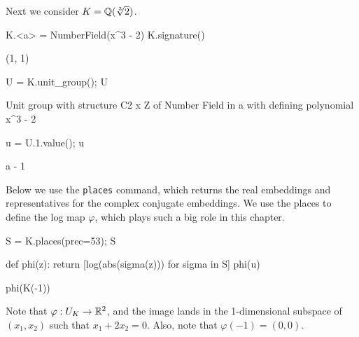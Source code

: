 Next we consider $K=\mathbb{Q}(\sqrt[3]{2})$.
\begin{sagecode}
\begin{sagecell}
K.<a> = NumberField(x^3 - 2)
K.signature()
\end{sagecell}
\begin{sageout}
(1, 1)
\end{sageout}
\begin{sagecell}
U = K.unit_group(); U
\end{sagecell}
\begin{sageout}
Unit group with structure C2 x Z of Number Field in a with
defining polynomial x^3 - 2
\end{sageout}
\begin{sagecell}
\end{sagecell}
\begin{sageout}
[-1, a - 1]
\end{sageout}
\begin{sagecell}
u = U.1.value(); u
\end{sagecell}
\begin{sageout}
a - 1
\end{sageout}
\end{sagecode} %

Below we use the \verb|places| command, which returns the real embeddings
and representatives for the complex conjugate embeddings.
We use the places to define the log map $\varphi$, which plays such a big
role in this chapter.
\begin{sagecode} %
\begin{sagecell}
S = K.places(prec=53); S
\end{sagecell}
\begin{sageout}
\end{sageout}
\begin{sagecell}
def phi(z):
    return [log(abs(sigma(z))) for sigma in S]
phi(u)
\end{sagecell}
\begin{sageout}
[-1.3473773483293832, 0.673688674164692]
\end{sageout}
\begin{sagecell}
phi(K(-1))
\end{sagecell}
\begin{sageout}
[0.0, 0.0]
\end{sageout}
\end{sagecode}
Note that $\varphi:U_K \to \mathbb{R}^2$, and the image lands in the
1-dimensional subspace of $(x_1,x_2)$ such that $x_1 +2x_2 = 0$. Also,
note that $\varphi(-1)=(0,0)$.


